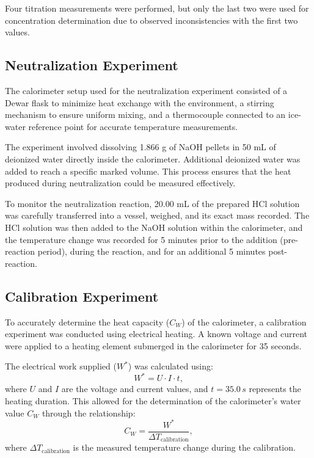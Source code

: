 \documentclass[a4paper,12pt]{article}
\begin{document}
Four titration measurements were performed, but only the last two were used for concentration determination due to observed inconsistencies with the first two values.

\subsection{Neutralization Experiment}
The calorimeter setup used for the neutralization experiment consisted of a Dewar flask to minimize heat exchange with the environment, a stirring mechanism to ensure uniform mixing, and a thermocouple connected to an ice-water reference point for accurate temperature measurements.

The experiment involved dissolving 1.866 g of NaOH pellets in 50 mL of deionized water directly inside the calorimeter. Additional deionized water was added to reach a specific marked volume. This process ensures that the heat produced during neutralization could be measured effectively.

To monitor the neutralization reaction, 20.00 mL of the prepared HCl solution was carefully transferred into a vessel, weighed, and its exact mass recorded. The HCl solution was then added to the NaOH solution within the calorimeter, and the temperature change was recorded for 5 minutes prior to the addition (pre-reaction period), during the reaction, and for an additional 5 minutes post-reaction.

\subsection{Calibration Experiment}
To accurately determine the heat capacity (\(C_W\)) of the calorimeter, a calibration experiment was conducted using electrical heating. A known voltage and current were applied to a heating element submerged in the calorimeter for 35 seconds. 

The electrical work supplied (\(W^*\)) was calculated using:
\begin{equation}
W^* = U \cdot I \cdot t,
\end{equation}
where \(U\) and \(I\) are the voltage and current values, and \(t = 35.0 \, s\) represents the heating duration. This allowed for the determination of the calorimeter's water value \(C_W\) through the relationship:
\begin{equation}
C_W = \frac{W^*}{\Delta T_{\text{calibration}}},
\end{equation}
where \(\Delta T_{\text{calibration}}\) is the measured temperature change during the calibration.
\end{document}
